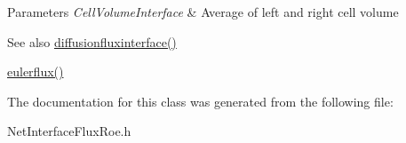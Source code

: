 \begin{DoxyParams}{Parameters}
{\em Cell\+Volume\+Interface} & Average of left and right cell volume\\
\hline
\end{DoxyParams}
\begin{DoxySeeAlso}{See also}
\hyperlink{classdiffusionfluxinterface}{diffusionfluxinterface()} 

\hyperlink{classeulerflux}{eulerflux()}
\end{DoxySeeAlso}


The documentation for this class was generated from the following file\+:\begin{DoxyCompactItemize}
\item 
Net\+Interface\+Flux\+Roe.\+h\end{DoxyCompactItemize}
